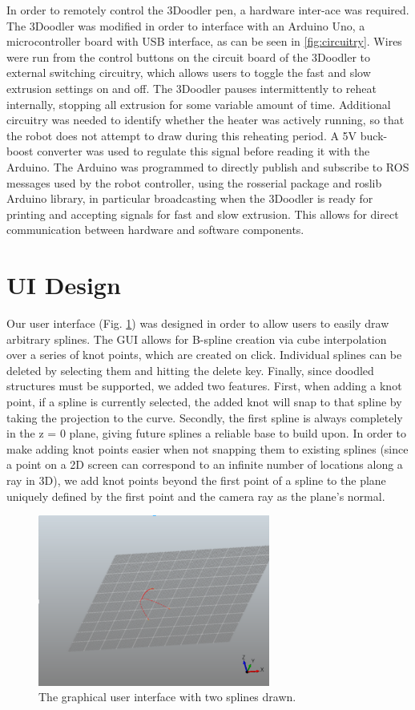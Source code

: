 \documentclass[conference]{acmsiggraph}
\begin{document}
In order to remotely control the 3Doodler pen, a hardware inter-ace was required. The 3Doodler was modified in order to interface with an Arduino Uno, a microcontroller board with USB interface, as can be seen in \ref{fig:circuitry}. Wires were run from the control buttons on the circuit board of the 3Doodler to external switching circuitry, which allows users to toggle the fast and slow extrusion settings on and off. The 3Doodler pauses intermittently to reheat internally, stopping all extrusion for some variable amount of time. Additional circuitry was needed to identify whether the heater was actively running, so that the robot does not attempt to draw during this reheating period. A 5V buck-boost converter was used to regulate this signal before reading it with the Arduino. The Arduino was programmed to directly publish and subscribe to ROS messages used by the robot controller, using the rosserial
package and roslib Arduino library, in particular broadcasting when the 3Doodler is ready for printing and accepting signals for fast and slow extrusion. This allows for direct communication between hardware and software components.



\section{UI Design}
Our user interface (Fig. \ref{fig:GUI}) was designed in order to allow users to easily draw arbitrary splines. The GUI allows for B-spline creation via cube interpolation over a series of knot points, which are created on click. Individual splines can be deleted by selecting them and hitting the delete key.  Finally, since doodled structures
must be supported, we added two features. First, when adding a knot point, if a spline is currently selected, the added knot will snap to that spline by taking the projection to the curve. Secondly, the first spline is always completely in the z = 0 plane, giving future splines a reliable base to build upon. In order to make adding knot points easier when not snapping them to existing splines (since a point on a 2D screen can correspond to an infinite number of locations along a ray in 3D), we add knot points beyond the first point of a spline to the plane uniquely defined by the first point and the camera ray as the plane’s normal.

\begin{figure}[t]
\centering
\includegraphics[width=3.0in]{images/GUI.png}
\caption{The graphical user interface with two splines drawn.}
\label{fig:GUI}
\end{figure}
\end{document}
